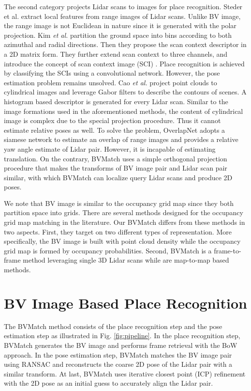 \documentclass[letterpaper, 10 pt, journal, twoside]{IEEEtran}
\begin{document}
The second category projects Lidar scans to images for place recognition. Steder et al. \cite{2011Place} extract local features from range images of Lidar scans. {Unlike BV image, the range image is not Euclidean in nature since it is generated with the polar projection.} Kim \emph{et al.} \cite{kim2018scan} partition the ground space into bins according to both azimuthal and radial directions. Then they propose the scan context descriptor in a 2D matrix form. They further extend scan context to three channels, and introduce the concept of scan context image (SCI) \cite{kim20191}. Place recognition is achieved by classifying the SCIs using a convolutional network. {However, the pose estimation problem remains unsolved.} Cao \emph{et al.} \cite{cao2020season} project point clouds to cylindrical images and leverage Gabor filters to describe the contours of scenes. A histogram based descriptor is generated for every Lidar scan. {Similar to the image formations used in the aforementioned methods, the content of cylindrical image is complex due to the special projection procedure.} Thus it cannot estimate relative poses as well. To solve the problem, OverlapNet \cite{chen2020overlapnet} adopts a siamese network to estimate an overlap of range images and provides a relative yaw angle estimate of Lidar pair. However, it is incapable of estimating translation. On the contrary, BVMatch uses a simple orthogonal projection procedure that makes the transforms of BV image pair and Lidar scan pair similar, with which BVMatch can localize query Lidar scans and produce 2D poses.

{We note that BV image is similar to the occupancy grid map \cite{1989using} since they both partition space into grids. There are several methods \cite{blanco2007a,rapp2015a} designed for the occupancy grid map matching in the literature. Our BVMatch differs from these methods in two aspects. First, they target on two different types of representation. More specifically, the BV image is built with point cloud density while the occupancy grid map is formed by occupancy probabilities. Second, BVMatch is a frame-to-frame method  leveraging single 3D Lidar scans while \cite{blanco2007a,rapp2015a} are map-to-map based methods.}


\section{BV Image Based Place Recognition} 
The BVMatch method consists of the place recognition step and the pose estimation step as illustrated in Fig. \ref{fig:pipeline}. In the place recognition step, BVMatch generates the BV image and performs frame retrieval with the BoW approach. In the pose estimation step,  BVMatch matches the BV image pair using RANSAC and reconstructs the coarse 2D pose of the Lidar pair with a similar transform. At last, BVMatch uses iterative closest point (ICP) refinement with the 2D pose as an initial guess to accurately align the Lidar pair.  
\end{document}
